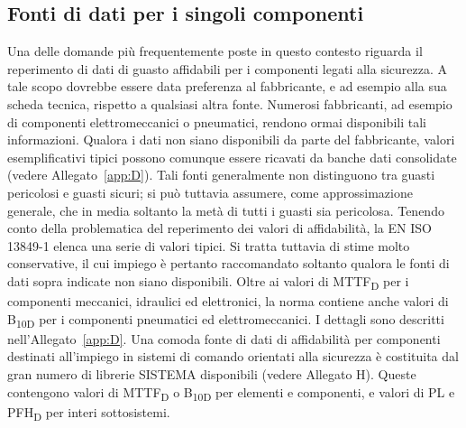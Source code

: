 \subsection{Fonti di dati per i singoli componenti}
\label{subsec:06-2-12}
Una delle domande più frequentemente poste in questo contesto riguarda il reperimento di dati di guasto affidabili per i componenti legati alla sicurezza. A tale scopo dovrebbe essere data preferenza al fabbricante, e ad esempio alla sua scheda tecnica, rispetto a qualsiasi altra fonte. Numerosi fabbricanti, ad esempio di componenti elettromeccanici o pneumatici, rendono ormai disponibili tali informazioni. Qualora i dati non siano disponibili da parte del fabbricante, valori esemplificativi tipici possono comunque essere ricavati da banche dati consolidate (vedere Allegato~\ref{app:D}). Tali fonti generalmente non distinguono tra guasti pericolosi e guasti sicuri; si può tuttavia assumere, come approssimazione generale, che in media soltanto la metà di tutti i guasti sia pericolosa. Tenendo conto della problematica del reperimento dei valori di affidabilità, la EN ISO 13849-1 elenca una serie di valori tipici. Si tratta tuttavia di stime molto conservative, il cui impiego è pertanto raccomandato soltanto qualora le fonti di dati sopra indicate non siano disponibili. Oltre ai valori di MTTF\textsubscript{D} per i componenti meccanici, idraulici ed elettronici, la norma contiene anche valori di B\textsubscript{10D} per i componenti pneumatici ed elettromeccanici. I dettagli sono descritti nell'Allegato~\ref{app:D}.
Una comoda fonte di dati di affidabilità per componenti destinati all'impiego in sistemi di comando orientati alla sicurezza è costituita dal gran numero di librerie SISTEMA disponibili (vedere Allegato H). Queste contengono valori di MTTF\textsubscript{D} o B\textsubscript{10D} per elementi e componenti, e valori di PL e PFH\textsubscript{D} per interi sottosistemi.

